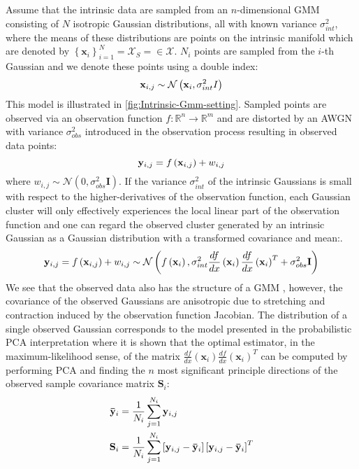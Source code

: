 Assume that the intrinsic data are sampled from an $n$-dimensional \ac{GMM} consisting of $N$ isotropic Gaussian distributions, all with known variance $\sigma_{int}^{2}$, where the means of these distributions are points on the intrinsic manifold which are denoted by $\left\{ \mathbf{x}_{i}\right\} _{i=1}^{N}=\mathcal{X}_{S}=\in\mathcal{X}$. $N_{i}$ points are sampled from the $i$-th Gaussian and we denote these points using a double index:
\[
{\bf x}_{i,j}\sim\mathcal{N}\left(\mathbf{x}_{i},\sigma_{int}^{2}I\right)
\]
This model is illustrated in \cref{fig:Intrinsic-Gmm-setting}. Sampled points are observed via an observation function $f:\mathbb{R}^{n}\to\mathbb{R}^{m}$ and are distorted by an \ac{AWGN} with variance $\sigma_{obs}^{2}$ introduced in the observation process resulting in observed data points:
\[
{\bf y}_{i,j}=f\left({\bf x}_{i,j}\right)+w_{i,j}
\]
where $w_{i,j}\sim\mathcal{N}\left(0,\sigma_{obs}^{2}\mathbf{I}\right)$. If the variance $\sigma_{int}^{2}$ of the intrinsic Gaussians is small with respect to the higher-derivatives of the observation function, each Gaussian cluster will only effectively experiences the local linear part of the observation function and one can regard the observed cluster generated by an intrinsic Gaussian as a Gaussian distribution with a transformed covariance and mean:.
\begin{equation}
{\bf y}_{i,j}=f\left({\bf x}_{i,j}\right)+w_{i,j}\sim\mathcal{N}\left(f\left(\mathbf{x}_{i}\right),\sigma_{int}^{2}\frac{df}{dx}\left(\mathbf{x}_{i}\right)\frac{df}{dx}\left(\mathbf{x}_{i}\right)^{T}+\sigma_{obs}^{2}\mathbf{I}\right)\label{eq:prob-pca}
\end{equation}
We see that the observed data also has the structure of a \ac{GMM} , however, the covariance of the observed Gaussians are anisotropic due to stretching and contraction induced by the observation function Jacobian. The distribution of a single observed Gaussian corresponds to the model presented in the probabilistic \ac{PCA} interpretation \cite{tipping1999probabilistic} where it is shown that the optimal estimator, in the maximum-likelihood sense, of the matrix $\frac{df}{dx}\left(\mathbf{x}_{i}\right)\frac{df}{dx}\left(\mathbf{x}_{i}\right)^{T}$ can be computed by performing \ac{PCA} and finding the $n$ most significant principle directions of the observed sample covariance
matrix $\mathbf{S}_{i}$:
\[
\begin{aligned}{\bf \bar{y}}_{i} & =\frac{1}{N_{i}}\sum_{j=1}^{N_{i}}{\bf y}_{i,j}\\
\mathbf{S}_{i} & =\frac{1}{N_{i}}\sum_{j=1}^{N_{i}}\left[{\bf y}_{i,j}-{\bf \bar{y}}_{i}\right]\left[{\bf y}_{i,j}-{\bf \bar{y}}_{i}\right]^{T}
\end{aligned}
\]
